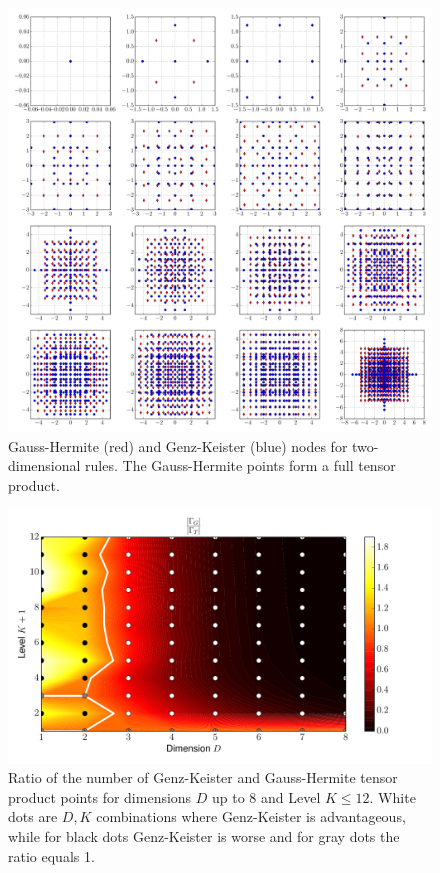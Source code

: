 \documentclass[a4paper,10pt]{article}
\begin{document}
\begin{figure}[h]
  \centering
  \includegraphics[width=\linewidth]{./img/gk_hermitephy_nodes_2d.pdf}
  \caption{Gauss-Hermite (red) and Genz-Keister (blue) nodes for
  two-dimensional rules. The Gauss-Hermite points form a full tensor
  product.}
  \label{fig:gk_hermitephy_nodes_2d}
\end{figure}

\begin{figure}[h]
  \centering
  \includegraphics[width=0.8\linewidth]{./img/gk_hermitephy_ratio.pdf}
  \caption{Ratio of the number of Genz-Keister and Gauss-Hermite tensor product
  points for dimensions $D$ up to 8 and Level $K \leq 12$. White dots are $D,K$
  combinations where Genz-Keister is advantageous, while for black dots
  Genz-Keister is worse and for gray dots the ratio equals 1.}
  \label{fig:gk_hermitephy_ratio}
\end{figure}
\end{document}
